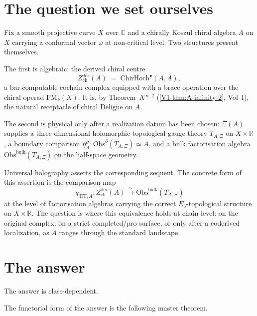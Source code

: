 \section{The question we set ourselves}
\label{sec:climax-question}

Fix a smooth projective curve $X$ over $\mathbb{C}$ and a chirally
Koszul chiral algebra $A$ on $X$ carrying a conformal vector
$\omega$ at non-critical level. Two structures present themselves.

The first is algebraic: the derived chiral centre
\[
 Z^{\mathrm{der}}_{\mathrm{ch}}(A) \;=\; \mathrm{ChirHoch}^{\bullet}(A, A),
\]
a bar-computable cochain complex equipped with a brace operation
over the chiral operad $\mathrm{FM}_{k}(X)$. It is, by
Theorem~A$^{\infty,2}$ (\cref{V1-thm:A-infinity-2}, Vol~I), the
natural receptacle of chiral Deligne on $A$.

The second is physical only after a realization datum has been chosen:
\(\Xi(A)\) supplies a three-dimensional holomorphic-topological
gauge theory \(T_{A,\Xi}\) on \(X \times \mathbb{R}\), a boundary
comparison
\(\eta^\partial_A\colon\mathrm{Obs}^{\partial}(T_{A,\Xi})\simeq A\),
and a bulk factorisation algebra
\(\mathrm{Obs}^{\mathrm{bulk}}(T_{A,\Xi})\) on the half-space
geometry.

Universal holography asserts the corresponding sequent. The concrete
form of this assertion is the comparison map
\[
 \chi_{\mathrm{HT},A}\colon
 Z^{\mathrm{der}}_{\mathrm{ch}}(A)
 \xrightarrow{\simeq}
 \mathrm{Obs}^{\mathrm{bulk}}(T_{A,\Xi})
\]
at the level of factorisation algebras carrying the correct
$E_{3}$-topological structure on $X \times \mathbb{R}$. The
question is where this equivalence holds at chain level: on the
original complex, on a strict completed/pro surface, or only after a
coderived localization, as $A$ ranges through the standard landscape.

\section{The answer}
\label{sec:climax-answer}

The answer is class-dependent.

The functorial form of the answer is the following master theorem.

